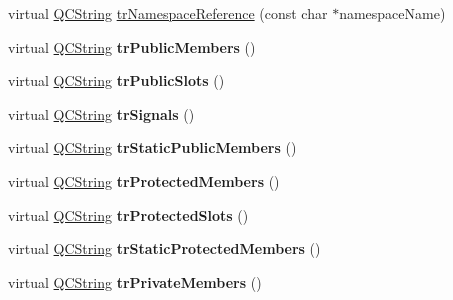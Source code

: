 \begin{DoxyCompactItemize}
\item 
virtual \mbox{\hyperlink{class_q_c_string}{Q\+C\+String}} \mbox{\hyperlink{class_translator_portuguese_ab46e3a8d64cb394d06492746feae4114}{tr\+Namespace\+Reference}} (const char $\ast$namespace\+Name)
\item 
\mbox{\label{class_translator_portuguese_af3328603161c161c8d9d7beee0ad956d}} 
virtual \mbox{\hyperlink{class_q_c_string}{Q\+C\+String}} {\bfseries tr\+Public\+Members} ()
\item 
\mbox{\label{class_translator_portuguese_ab129ecfe1a3ab25de7cd5d24dc5d4321}} 
virtual \mbox{\hyperlink{class_q_c_string}{Q\+C\+String}} {\bfseries tr\+Public\+Slots} ()
\item 
\mbox{\label{class_translator_portuguese_a9f3d61d59c8944ff1cf04c4d931af6b7}} 
virtual \mbox{\hyperlink{class_q_c_string}{Q\+C\+String}} {\bfseries tr\+Signals} ()
\item 
\mbox{\label{class_translator_portuguese_a6bffeb7f1279ab0c23c0e62b2f87e93d}} 
virtual \mbox{\hyperlink{class_q_c_string}{Q\+C\+String}} {\bfseries tr\+Static\+Public\+Members} ()
\item 
\mbox{\label{class_translator_portuguese_a95f5c9579a384ade899136e6453dff00}} 
virtual \mbox{\hyperlink{class_q_c_string}{Q\+C\+String}} {\bfseries tr\+Protected\+Members} ()
\item 
\mbox{\label{class_translator_portuguese_a8f745b6bd11fdfb8211eb76d6b6d1747}} 
virtual \mbox{\hyperlink{class_q_c_string}{Q\+C\+String}} {\bfseries tr\+Protected\+Slots} ()
\item 
\mbox{\label{class_translator_portuguese_afdce03d8f63e0a69e969545953c6e758}} 
virtual \mbox{\hyperlink{class_q_c_string}{Q\+C\+String}} {\bfseries tr\+Static\+Protected\+Members} ()
\item 
\mbox{\label{class_translator_portuguese_a3f1ebf2e5614e0febc237d012aee2a5d}} 
virtual \mbox{\hyperlink{class_q_c_string}{Q\+C\+String}} {\bfseries tr\+Private\+Members} ()

\end{DoxyCompactItemize}
